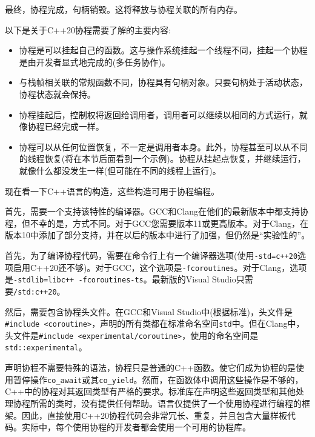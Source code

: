 最终，协程完成，句柄销毁。这将释放与协程关联的所有内存。

以下是关于C++20协程需要了解的主要内容:

\begin{itemize}
\item
协程是可以挂起自己的函数。这与操作系统挂起一个线程不同，挂起一个协程是由开发者显式地完成的(多任务协作)。

\item
与栈帧相关联的常规函数不同，协程具有句柄对象。只要句柄处于活动状态，协程状态就会保持。

\item
协程挂起后，控制权将返回给调用者，调用者可以继续以相同的方式运行，就像协程已经完成一样。 

\item 
协程可以从任何位置恢复，不一定是调用者本身。此外，协程甚至可以从不同的线程恢复(将在本节后面看到一个示例)。协程从挂起点恢复，并继续运行，就像什么都没发生一样(但可能在不同的线程上运行)。
\end{itemize}


现在看一下C++语言的构造，这些构造可用于协程编程。 

首先，需要一个支持该特性的编译器。GCC和Clang在他们的最新版本中都支持协程，但不幸的是，方式不同。对于GCC您需要版本11或更高版本。对于Clang，在版本10中添加了部分支持，并在以后的版本中进行了加强，但仍然是“实验性的”。

首先，为了编译协程代码，需要在命令行上有一个编译器选项(使用\texttt{-std=c++20}选项启用C++20还不够)。对于GCC，这个选项是\texttt{-fcoroutines}。对于Clang，选项是\texttt{-stdlib=libc++ -fcoroutines-ts}。最新版的Visual Studio只需要\texttt{/std:c++20}。

然后，需要包含协程头文件。在GCC和Visual Studio中(根据标准)，头文件是\texttt{\#include <coroutine>}，声明的所有类都在标准命名空间\texttt{std}中。但在Clang中，头文件是\texttt{\#include <experimental/coroutine>}，使用的命名空间是\texttt{std::experimental}。

声明协程不需要特殊的语法，协程只是普通的C++函数。使它们成为协程的是使用暂停操作\texttt{co\_await}或其\texttt{co\_yield}。然而，在函数体中调用这些操作是不够的，C++中的协程对其返回类型有严格的要求。标准库在声明这些返回类型和其他处理协程所需的类时，没有提供任何帮助。语言仅提供了一个使用协程进行编程的框架。因此，直接使用C++20协程代码会非常冗长、重复，并且包含大量样板代码。实际中，每个使用协程的开发者都会使用一个可用的协程库。 

